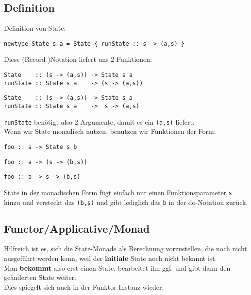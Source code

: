 \documentclass{beamer}
\begin{document}
\subsection{Definition}
\begin{frame}[fragile]
Definition von State:
\begin{verbatim}
newtype State s a = State { runState :: s -> (a,s) }
\end{verbatim}
\pause
Diese (Record-)Notation liefert uns 2 Funktionen:
\begin{overprint}
\begin{verbatim}
State    :: (s -> (a,s)) -> State s a
runState :: State s a    -> (s -> (a,s))
\end{verbatim}
\begin{verbatim}
State    :: (s -> (a,s)) -> State s a
runState :: State s a    ->  s -> (a,s)
\end{verbatim}
\end{overprint}
\texttt{runState} benötigt also 2 Argumente, damit es ein \texttt{(a,s)} liefert.\bigskip \\
Wenn wir State monadisch nutzen, benutzen wir Funktionen der Form:
\begin{overprint}
\begin{verbatim}
foo :: a -> State s b
\end{verbatim}
\begin{verbatim}
foo :: a -> (s -> (b,s))
\end{verbatim}
\begin{verbatim}
foo :: a -> s -> (b,s)
\end{verbatim}
\end{overprint}
State in der monadischen Form fügt einfach nur einen Funktionsparameter \texttt{s} hinzu und versteckt das \texttt{(b,s)} und gibt lediglich das \texttt{b} in der do-Notation zurück.
\end{frame}

\subsection{Functor/Applicative/Monad}
\begin{frame}[fragile]
Hilfreich ist es, sich die State-Monade als Berechnung vorzustellen, die noch nicht ausgeführt werden kann, weil der \textbf{initiale} State noch nicht bekannt ist.\bigskip \\
\pause
Man \textbf{bekommt} also erst einen State, bearbeitet ihn ggf. und gibt dann den geänderten State weiter.\\
\pause
Dies spiegelt sich auch in der Funktor-Instanz wieder:
\end{frame}
\end{document}
